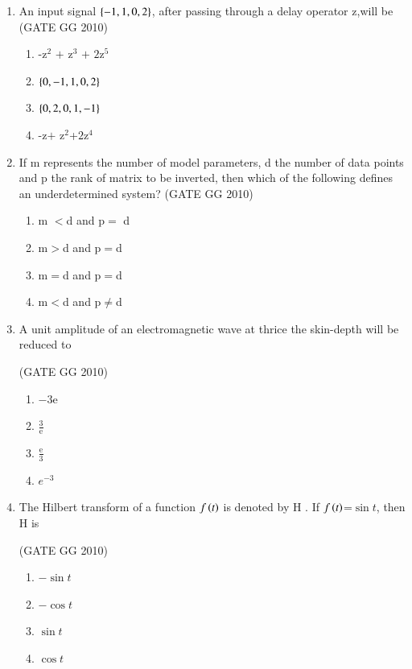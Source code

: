 \documentclass[journal]{IEEEtran}
\begin{document}
\begin{enumerate}[start=26]
\item An input signal $\left\{-1,1,0,2\right\}$, after passing through a delay 
operator z,will be\\

\hfill{(GATE GG 2010)}

\begin{enumerate}

    \item -z$^2$ $+$ z$^3$ $+$ $2$z$^5$
    \item $\left\{0,-1,1,0,2\right\}$
    \item $\left\{0,2,0,1,-1\right\}$
    \item -z$+$ z$^2$+$2$z$^4$
\end{enumerate}
\item If m represents the number of model parameters, d the number of data points and p the rank of matrix to be inverted, then which of the following defines an underdetermined system?
\hfill{(GATE GG 2010)}
\begin{enumerate}
    \item  m $<$d and p$=$ d
\item  m$>$d and p$=$d
\item  m$=$d and p$=$d
\item  m$<$d and p$\neq$d
\end{enumerate}

\item A unit amplitude of an electromagnetic wave at thrice the skin-depth will be reduced to

\hfill{(GATE GG 2010)}

\begin{enumerate}
    \item $-3$e
\item $\frac{3}{\text{e}}$
\item $\frac{\text{e}}{3}$
\item $e^{-3}$
\end{enumerate}

\item The Hilbert transform of a function $f\left(t\right)$ is denoted by H . If $f\left(t\right)$=$\sin{t}$, then H  is

\hfill{(GATE GG 2010)}

\begin{enumerate}
    \item $-\sin{t}$
\item $-\cos{t}$
\item $\sin{t}$
\item $\cos{t}$
\end{enumerate}


\end{enumerate}
\end{document}
